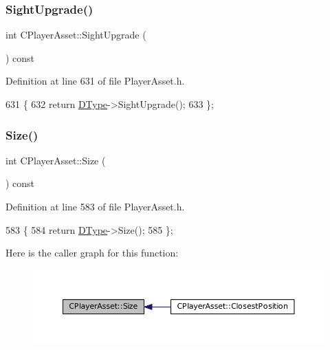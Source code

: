 \subsubsection{\texorpdfstring{Sight\+Upgrade()}{SightUpgrade()}}
{\footnotesize\ttfamily int C\+Player\+Asset\+::\+Sight\+Upgrade (\begin{DoxyParamCaption}{ }\end{DoxyParamCaption}) const\hspace{0.3cm}{\ttfamily [inline]}}



Definition at line 631 of file Player\+Asset.\+h.


\begin{DoxyCode}
631                                 \{
632             \textcolor{keywordflow}{return} \hyperlink{classCPlayerAsset_a5d61f73471e1e6f0a6ab15f2ffa7b359}{DType}->SightUpgrade();
633         \};
\end{DoxyCode}
\hypertarget{classCPlayerAsset_a85a9e2ce62f557e93219676117159fec}{}\label{classCPlayerAsset_a85a9e2ce62f557e93219676117159fec} 
\subsubsection{\texorpdfstring{Size()}{Size()}}
{\footnotesize\ttfamily int C\+Player\+Asset\+::\+Size (\begin{DoxyParamCaption}{ }\end{DoxyParamCaption}) const\hspace{0.3cm}{\ttfamily [inline]}}



Definition at line 583 of file Player\+Asset.\+h.


\begin{DoxyCode}
583                         \{
584             \textcolor{keywordflow}{return} \hyperlink{classCPlayerAsset_a5d61f73471e1e6f0a6ab15f2ffa7b359}{DType}->Size(); 
585         \};
\end{DoxyCode}
Here is the caller graph for this function\+:\nopagebreak
\begin{figure}[H]
\begin{center}
\leavevmode
\includegraphics[width=350pt]{classCPlayerAsset_a85a9e2ce62f557e93219676117159fec_icgraph}
\end{center}
\end{figure}
\hypertarget{classCPlayerAsset_af1c093600f1567e3abf1cefc0f5350d5}{}\label{classCPlayerAsset_af1c093600f1567e3abf1cefc0f5350d5} 
